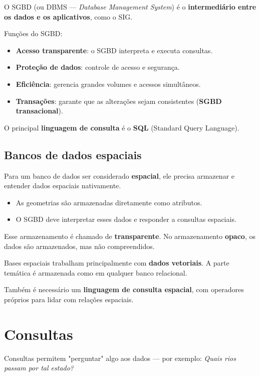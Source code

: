 O SGBD (ou DBMS — \emph{Database Management System}) é o \textbf{intermediário entre os dados e os aplicativos}, como o SIG.

Funções do SGBD:

\begin{itemize}
	\item \textbf{Acesso transparente}: o SGBD interpreta e executa consultas.
	\item \textbf{Proteção de dados}: controle de acesso e segurança.
	\item \textbf{Eficiência}: gerencia grandes volumes e acessos simultâneos.
	\item \textbf{Transações}: garante que as alterações sejam consistentes (\textbf{SGBD transacional}).
\end{itemize}

O principal \textbf{linguagem de consulta} é o \textbf{SQL} (Standard Query Language).

\subsection{Bancos de dados espaciais}

Para um banco de dados ser considerado \textbf{espacial}, ele precisa armazenar e entender dados espaciais nativamente.

\begin{itemize}
\item As geometrias são armazenadas diretamente como atributos.
\item O SGBD deve interpretar esses dados e responder a consultas espaciais.
\end{itemize}

Esse armazenamento é chamado de \textbf{transparente}. No armazenamento \textbf{opaco}, os dados são armazenados, mas não compreendidos.

Bases espaciais trabalham principalmente com \textbf{dados vetoriais}. A parte temática é armazenada como em qualquer banco relacional.

Também é necessário um \textbf{linguagem de consulta espacial}, com operadores próprios para lidar com relações espaciais.

\section{Consultas}

Consultas permitem "perguntar" algo aos dados — por exemplo: \emph{Quais rios passam por tal estado?}

